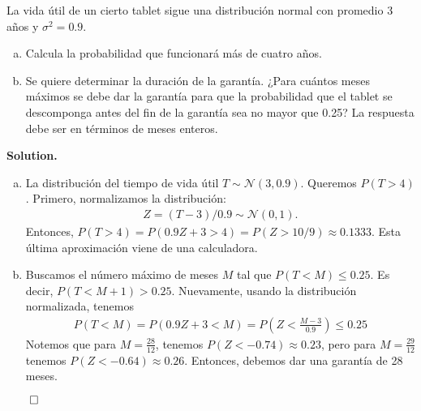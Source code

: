 \documentclass{article}
\theoremstyle{problemstyle}
\newenvironment{solution}{%
  \begin{mdframed}[linewidth=0.8pt,linecolor=Gray,backgroundcolor=Gray!5,roundcorner=5pt]%
  \noindent\textbf{Solution.}%
}{%
\hfill $ \qed $ 
  \end{mdframed}%
}
\begin{document}
\begin{problem}
La vida \'util de un cierto tablet sigue una distribuci\'on normal con promedio
3 a\~nos y $ \sigma^2 = 0.9$.
\begin{enumerate}[a)]
	\item Calcula la probabilidad que funcionar\'a m\'as de cuatro a\~nos.
	\item Se quiere determinar la duraci\'on de la garant\'ia. ¿Para cu\'antos
	      meses m\'aximos se debe dar la garant\'ia para que la probabilidad que el
	      tablet se descomponga antes del fin de la garant\'ia sea no mayor que 0.25?
	      La respuesta debe ser en t\'erminos de meses enteros.
\end{enumerate}
\end{problem}
\begin{solution}
	\begin{enumerate}[a)]
		\item La distribuci\'on del tiempo de vida \'util $ T\sim \mathcal N(3, 0.9) $. Queremos $ P(T>4) $. Primero, normalizamos la distribuci\'on:
		      \begin{align*}
			      Z = (T-3)/0.9\sim \mathcal N(0,1).
		      \end{align*}
		      Entonces, $ P(T>4) = P(0.9Z + 3 > 4) = P(Z > 10/9)\approx 0.1333 $. Esta \'ultima aproximaci\'on viene de una calculadora.
		\item Buscamos el n\'umero m\'aximo de meses $ M $ tal que $ P(T<M)\leq
			      0.25 $. Es decir, $ P(T<M+1) >0.25 $. Nuevamente, usando la
		      distribuci\'on normalizada, tenemos
		      \begin{align*}
            P(T<M) = P(0.9Z+3<M) = P\left(Z < \frac{M-3}{0.9}\right) \leq 0.25
		      \end{align*}
          Notemos que para $ M=\frac{28}{12} $, tenemos $ P(Z<-0.74) \approx 0.23 $, pero para $ M = \frac{29}{12} $ tenemos $ P(Z<-0.64)\approx 0.26 $. Entonces, debemos dar una garant\'ia de 28 meses.
	\end{enumerate}
\end{solution}
\end{document}
